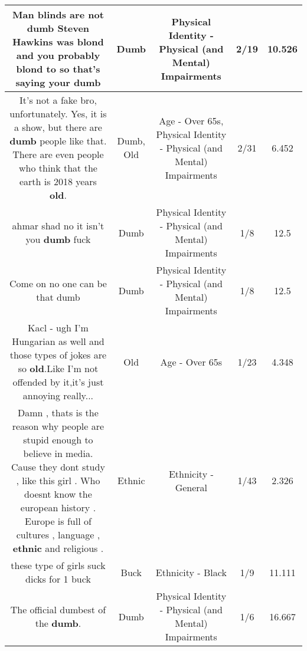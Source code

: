 \documentclass[11pt]{article}
\newlength\mylength
\begin{document}
\begin{center}
\begin{longtable}{|C{.65\mylength}|C{.30\mylength}|C{.12\mylength}|C{.12\mylength}|C{.12\mylength}|}
  \small Man blinds are not \textbf{dumb} Steven Hawkins was blond and you probably blond to so that's saying your dumb\normalsize   & Dumb & Physical Identity - Physical (and Mental) Impairments & 2/19 & 10.526 \\  \hline
  \small It's not a fake bro, unfortunately. Yes, it is a show, but there are \textbf{dumb} people like that. There are even people who think that the earth is 2018 years \textbf{old}.\normalsize   & Dumb, Old & Age - Over 65s, Physical Identity - Physical (and Mental) Impairments & 2/31 & 6.452 \\  \hline
  \small ahmar shad no it isn't you \textbf{dumb} fuck\normalsize   & Dumb & Physical Identity - Physical (and Mental) Impairments & 1/8 & 12.5 \\  \hline
  \small Come on no one can be that dumb\normalsize   & Dumb & Physical Identity - Physical (and Mental) Impairments & 1/8 & 12.5 \\  \hline
  \small Kacl - ugh I'm Hungarian as well and those types of jokes are so \textbf{old}.Like I'm not offended by it,it's just annoying really...\normalsize   & Old & Age - Over 65s & 1/23 & 4.348 \\  \hline
  \small Damn , thats is the reason why people are stupid enough to believe in media. Cause they dont study , like this girl . Who doesnt know the european history . Europe is full of cultures , language , \textbf{ethnic} and religious .\normalsize   & Ethnic & Ethnicity - General & 1/43 & 2.326 \\  \hline
  \small these type of girls suck dicks for 1 buck\normalsize   & Buck & Ethnicity - Black & 1/9 & 11.111 \\  \hline
  \small The official dumbest of the \textbf{dumb}.\normalsize   & Dumb & Physical Identity - Physical (and Mental) Impairments & 1/6 & 16.667 \\  \hline

\end{longtable}
\end{center}
\end{document}
